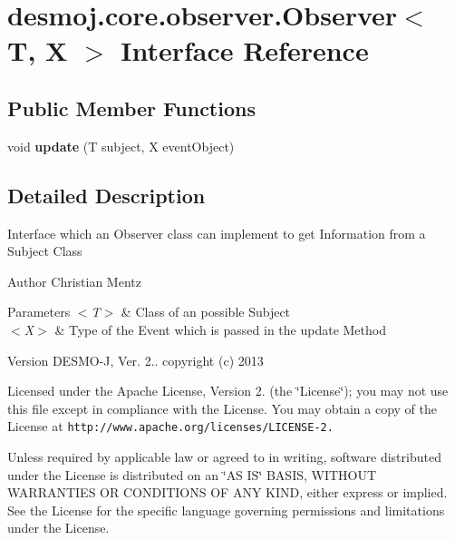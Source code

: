 \section{desmoj.\-core.\-observer.\-Observer$<$ T, X $>$ Interface Reference}
\label{interfacedesmoj_1_1core_1_1observer_1_1_observer_3_01_t_00_01_x_01_4}
\subsection*{Public Member Functions}
\begin{DoxyCompactItemize}
\item 
void {\bf update} (T subject, X event\-Object)
\end{DoxyCompactItemize}


\subsection{Detailed Description}
Interface which an Observer class can implement to get Information from a Subject Class

\begin{DoxyAuthor}{Author}
Christian Mentz
\end{DoxyAuthor}

\begin{DoxyParams}{Parameters}
{\em $<$\-T$>$} & Class of an possible Subject \\
\hline
{\em $<$\-X$>$} & Type of the Event which is passed in the update Method\\
\hline
\end{DoxyParams}
\begin{DoxyVersion}{Version}
D\-E\-S\-M\-O-\/\-J, Ver. 2.. copyright (c) 2013
\end{DoxyVersion}
Licensed under the Apache License, Version 2. (the \char`\"{}\-License\char`\"{}); you may not use this file except in compliance with the License. You may obtain a copy of the License at {\tt http\-://www.\-apache.\-org/licenses/\-L\-I\-C\-E\-N\-S\-E-\/2.}

Unless required by applicable law or agreed to in writing, software distributed under the License is distributed on an \char`\"{}\-A\-S I\-S\char`\"{} B\-A\-S\-I\-S, W\-I\-T\-H\-O\-U\-T W\-A\-R\-R\-A\-N\-T\-I\-E\-S O\-R C\-O\-N\-D\-I\-T\-I\-O\-N\-S O\-F A\-N\-Y K\-I\-N\-D, either express or implied. See the License for the specific language governing permissions and limitations under the License. 


